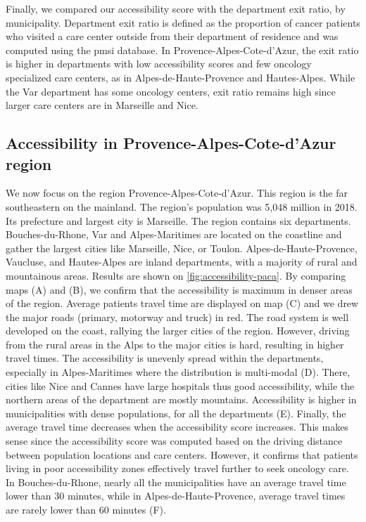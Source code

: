 Finally, we compared our accessibility score with the department exit ratio, by
municipality. Department exit ratio is defined as the proportion of cancer
patients who visited a care center outside from their department of residence
and was computed using the \ac{pmsi} database. In Provence-Alpes-Cote-d'Azur,
the exit ratio is higher in departments with low accessibility scores and few
oncology specialized care centers, as in Alpes-de-Haute-Provence and
Hautes-Alpes. While the Var department has some oncology centers, exit ratio
remains high since larger care centers are in Marseille and Nice.

\subsection*{Accessibility in Provence-Alpes-Cote-d'Azur region}

We now focus on the region Provence-Alpes-Cote-d'Azur. This region is the far
southeastern on the mainland. The region's population was 5,048 million in 2018.
Its prefecture and largest city is Marseille. The region contains six
departments. Bouches-du-Rhone, Var and Alpes-Maritimes are located on the
coastline and gather the largest cities like Marseille, Nice, or Toulon.
Alpes-de-Haute-Provence, Vaucluse, and Hautes-Alpes are inland departments, with
a majority of rural and mountainous areas. Results are shown on
\cref{fig:accessibility-paca}. By comparing maps (A) and (B), we confirm that
the accessibility is maximum in denser areas of the region. Average patients
travel time are displayed on map (C) and we drew the major roads (primary,
motorway and truck) in red. The road system is well developed on the coast,
rallying the larger cities of the region. However, driving from the rural areas
in the Alps to the major cities is hard, resulting in higher travel times. The
accessibility is unevenly spread within the departments, especially in
Alpes-Maritimes where the distribution is multi-modal (D). There, cities like
Nice and Cannes have large hospitals thus good accessibility, while the northern
areas of the department are mostly mountains. Accessibility is higher in
municipalities with dense populations, for all the departments (E). Finally, the
average travel time decreases when the accessibility score increases. This makes
sense since the accessibility score was computed based on the driving distance
between population locations and care centers. However, it confirms that
patients living in poor accessibility zones effectively travel further to seek
oncology care. In Bouches-du-Rhone, nearly all the municipalities have an
average travel time lower than 30 minutes, while in Alpes-de-Haute-Provence,
average travel times are rarely lower than 60 minutes (F).

